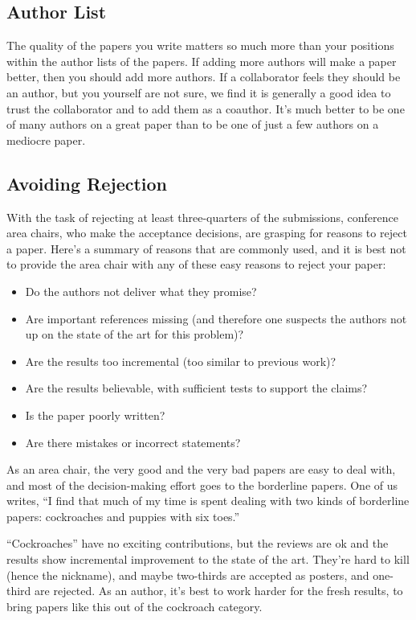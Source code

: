 \subsection{Author List}

The quality of the papers you write matters so much more than your positions within the author lists of the papers.  If adding more authors will make a paper better, then you should add more authors.   If a collaborator feels they should be an author, but you yourself are not sure, we find it is generally a good idea to trust the collaborator and to add them as a coauthor. It’s much better to be one of many authors on a great paper than to be one of just a few authors on a mediocre paper.

\subsection{Avoiding Rejection}

With the task of rejecting at least three-quarters of the submissions, conference area chairs, who make the acceptance decisions, are grasping for reasons to reject a paper.  Here’s a summary of reasons that are commonly used, and it is best not to provide the area chair with any of these easy reasons to reject your paper:

\begin{itemize}
\item Do the authors not deliver what they promise?
\item Are important references missing (and therefore one suspects the authors not up on the state of the art for this problem)?
\item Are the results too incremental (too similar to previous work)?
\item Are the results believable, with sufficient tests to support the claims?
\item Is the paper poorly written?  
\item Are there mistakes or incorrect statements?
\end{itemize}

As an area chair, the very good and the very bad papers are easy to deal with, and most of the decision-making effort goes to the borderline papers.  One of us writes, ``I find that much of my time is spent dealing with two kinds of borderline papers: cockroaches and  puppies with six toes.''  

``Cockroaches'' have no exciting contributions, but the reviews are ok and the results show incremental improvement to the state of the art.  They're hard to kill (hence the nickname), and maybe two-thirds are accepted as posters, and one-third are rejected.  As an author, it's best to work harder for the fresh results, to bring papers like this out of the cockroach category.

